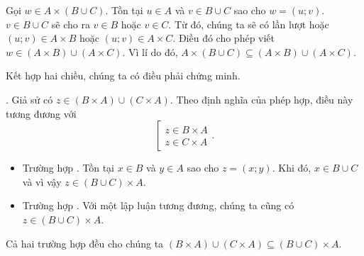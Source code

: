 Gọi $w \in A \times (B \cup C)$. Tồn tại $u \in A$ và $v \in B\cup C$ sao cho $w = (u; v)$. $v \in B \cup C$ sẽ cho ra $v \in B$ hoặc $v \in C$. Từ đó, chúng ta sẽ có lần lượt hoặc $(u; v) \in A \times B$ hoặc $(u; v) \in A \times C$. Điều đó cho phép viết $w \in (A \times B) \cup (A \times C)$. Vì lí do đó, $A \times (B \cup C) \subseteq (A \times B) \cup (A \times C)$.

Kết hợp hai chiều, chúng ta có điều phải chứng minh.

. Giả sử có $z \in (B \times A) \cup (C \times A)$. Theo định nghĩa của phép hợp, điều này tương đương với
$$\left[\begin{array}{l}
z \in B \times A \\
z \in C \times A
\end{array}\right..$$
\begin{itemize}
   \item Trường hợp . Tồn tại $x \in B$ và $y \in A$ sao cho $z = (x; y)$. Khi đó, $x \in B \cup C$ và vì vậy $z \in (B \cup C) \times A$.
   \item Trường hợp . Với một lập luận tương đương, chúng ta cũng có $z \in (B \cup C) \times A$.
\end{itemize}
Cả hai trường hợp đều cho chúng ta $(B \times A) \cup (C \times A) \subseteq (B \cup C) \times A$.

